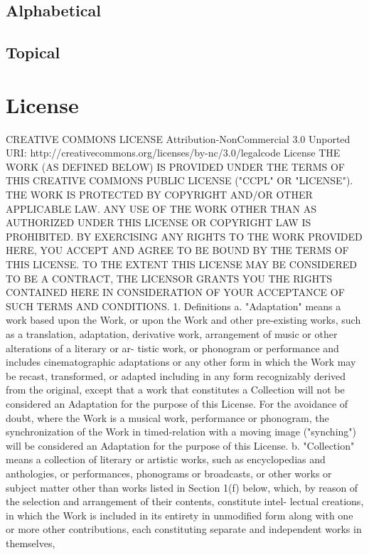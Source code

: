 \documentclass[oneside]{book}
\begin{document}
\chapter{Alphabetical}

\chapter{Topical}

\part{License}

CREATIVE COMMONS LICENSE Attribution-NonCommercial 3.0 Unported URI:
http://creativecommons.org/licenses/by-nc/3.0/legalcode License THE WORK (AS
DEFINED BELOW) IS PROVIDED UNDER THE TERMS OF THIS CREATIVE COMMONS PUBLIC
LICENSE ("CCPL" OR "LICENSE"). THE WORK IS PROTECTED BY COPYRIGHT AND/OR OTHER
APPLICABLE LAW. ANY USE OF THE WORK OTHER THAN AS AUTHORIZED UNDER THIS LICENSE
OR COPYRIGHT LAW IS PROHIBITED.  BY EXERCISING ANY RIGHTS TO THE WORK PROVIDED
HERE, YOU ACCEPT AND AGREE TO BE BOUND BY THE TERMS OF THIS LICENSE. TO THE
EXTENT THIS LICENSE MAY BE CONSIDERED TO BE A CONTRACT, THE LICENSOR GRANTS YOU
THE RIGHTS CONTAINED HERE IN CONSIDERATION OF YOUR ACCEPTANCE OF SUCH TERMS AND
CONDITIONS.  1. Definitions a. "Adaptation" means a work based upon the Work, or
upon the Work and other pre-existing works, such as a translation, adaptation,
derivative work, arrangement of music or other alterations of a literary or ar-
tistic work, or phonogram or performance and includes cinematographic
adaptations or any other form in which the Work may be recast, transformed, or
adapted including in any form recognizably derived from the original, except
that a work that constitutes a Collection will not be considered an Adaptation
for the purpose of this License. For the avoidance of doubt, where the Work is a
musical work, performance or phonogram, the synchronization of the Work in
timed-relation with a moving image ("synching") will be considered an Adaptation
for the purpose of this License.  b. "Collection" means a collection of literary
or artistic works, such as encyclopedias and anthologies, or performances,
phonograms or broadcasts, or other works or subject matter other than works
listed in Section 1(f) below, which, by reason of the selection and arrangement
of their contents, constitute intel- lectual creations, in which the Work is
included in its entirety in unmodified form along with one or more other
contributions, each constituting separate and independent works in themselves,
\end{document}
